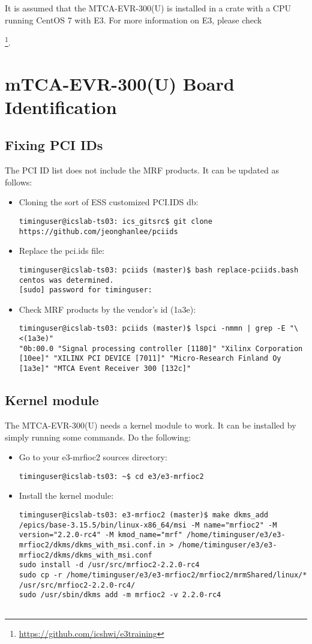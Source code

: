 \documentclass[11pt
  , a4paper
  , article
  , oneside
  , showtrims
]{memoir}
\begin{document}
It is assumed that the MTCA-EVR-300(U) is installed in a crate with a CPU running CentOS 7 with E3. For more information on E3, please check {\footnote{\url{https://github.com/icshwi/e3training}}.


\section{mTCA-EVR-300(U) Board Identification}

\subsection{Fixing PCI IDs}
The PCI ID list does not include the MRF products. It can be updated as follows:
\begin{itemize}
\item Cloning the sort of ESS customized PCI.IDS db:
\begin{lstlisting}[style=termstyle]
timinguser@icslab-ts03: ics_gitsrc$ git clone https://github.com/jeonghanlee/pciids
\end{lstlisting}
\item Replace the pci.ids file:
\begin{lstlisting}[style=termstyle]
timinguser@icslab-ts03: pciids (master)$ bash replace-pciids.bash
centos was determined.
[sudo] password for timinguser:
\end{lstlisting}
\item Check MRF products by the vendor's id (1a3e):
\begin{lstlisting}[style=termstyle]
timinguser@icslab-ts03: pciids (master)$ lspci -nmmn | grep -E "\<(1a3e)"
"0b:00.0 "Signal processing controller [1180]" "Xilinx Corporation [10ee]" "XILINX PCI DEVICE [7011]" "Micro-Research Finland Oy [1a3e]" "MTCA Event Receiver 300 [132c]"
\end{lstlisting}
\end{itemize}

\subsection{Kernel module}
The MTCA-EVR-300(U) needs a kernel module to work. It can be installed by simply running some commands. Do the following:
\begin{itemize}
\item Go to your e3-mrfioc2 sources directory:
\begin{lstlisting}[style=termstyle]
timinguser@icslab-ts03: ~$ cd e3/e3-mrfioc2
\end{lstlisting}
\item Install the kernel module:
\begin{lstlisting}[style=termstyle]
timinguser@icslab-ts03: e3-mrfioc2 (master)$ make dkms_add
/epics/base-3.15.5/bin/linux-x86_64/msi -M name="mrfioc2" -M  version="2.2.0-rc4" -M kmod_name="mrf" /home/timinguser/e3/e3-mrfioc2/dkms/dkms_with_msi.conf.in > /home/timinguser/e3/e3-mrfioc2/dkms/dkms_with_msi.conf
sudo install -d /usr/src/mrfioc2-2.2.0-rc4
sudo cp -r /home/timinguser/e3/e3-mrfioc2/mrfioc2/mrmShared/linux/* /usr/src/mrfioc2-2.2.0-rc4/
sudo /usr/sbin/dkms add -m mrfioc2 -v 2.2.0-rc4


\end{lstlisting}
\end{itemize}}
\end{document}
